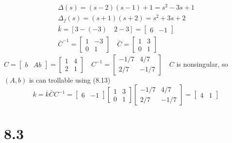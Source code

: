 \documentclass{article}
\begin{document}
$$
\begin{array}{l}
\Delta(s)=(s-2)(s-1)+1=s^{2}-3 s+1 \\
\Delta_{f}(s)=(s+1)(s+2)=s^{2}+3 s+2 \\
\bar{k}=[3-(-3) \quad 2-3]=\left[\begin{array}{cc}
6 & -1
\end{array}\right] \\
\bar{C}^{-1}=\left[\begin{array}{cc}
1 & -3 \\
0 & 1
\end{array}\right] \quad \bar{C}=\left[\begin{array}{cc}
1 & 3 \\
0 & 1
\end{array}\right]
\end{array}
$$
$C=\left[\begin{array}{ll}b & A b\end{array}\right]=\left[\begin{array}{ll}1 & 4 \\ 2 & 1\end{array}\right] \quad C^{-1}=\left[\begin{array}{cc}-1 / 7 & 4 / 7 \\ 2 / 7 & -1 / 7\end{array}\right] \quad C$ is nonsingular, so $(A, b)$ is can trollable
using (8.13)
$$
k=\overline{k} \bar{C} C^{-1}=\left[\begin{array}{ll}
6 & -1
\end{array}\right]\left[\begin{array}{ll}
1 & 3 \\
0 & 1
\end{array}\right]\left[\begin{array}{cc}
-1 / 7 & 4 / 7 \\
2 / 7 & -1 / 7
\end{array}\right]=\left[\begin{array}{ll}
4 & 1
\end{array}\right]
$$

\section*{8.3}
\end{document}
